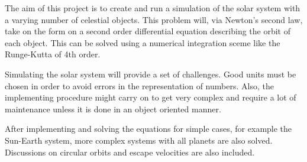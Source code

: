 The aim of this project is to create and run a simulation of the
solar system with a varying number of celestial objects. This
problem will, via Newton's second law, take on the form on a second
order differential equation describing the orbit of each object.
This can be solved using a numerical integration sceme like the
Runge-Kutta of 4th order.

Simulating the solar system will provide a set of challenges. Good
units must be chosen in order to avoid errors in the representation
of numbers. Also, the implementing procedure might carry on to get
very complex and require a lot of maintenance unless it is done in
an object oriented manner.

After implementing and solving the equations for simple cases, for
example the Sun-Earth system, more complex systems with all planets
are also solved. Discussions on circular orbits and escape
velocities are also included.
